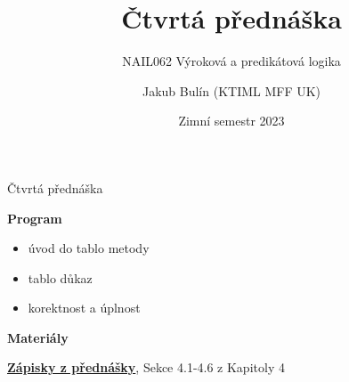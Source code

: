 \documentclass{beamer}
\title{Čtvrtá přednáška}
\subtitle{NAIL062 Výroková a predikátová logika}
\author{Jakub Bulín (KTIML MFF UK)}
\date{Zimní semestr 2023}
\begin{document}
\frame{\titlepage}


\begin{frame}{Čtvrtá přednáška}

    \textbf{Program}
        \begin{itemize}
            \item úvod do tablo metody
            \item tablo důkaz
            \item korektnost a úplnost
        \end{itemize}

    \textbf{Materiály}

        \href{https://github.com/jbulin-mff-uk/nail062/raw/main/lecture/lecture-notes/lecture-notes.pdf}{\alert{\textbf{Zápisky z přednášky}}}, Sekce 4.1-4.6 z Kapitoly 4

\end{frame}
\end{document}
